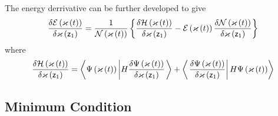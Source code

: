 The energy derrivative can be further developed to give 
\begin{equation}
\frac{\delta {\cal E}\left( {\cal \varkappa }\left( t\right) \right) }{%
\delta \varkappa \left( {\sf z}_{1}\right) }=\frac{1}{{\cal N}\left( {\cal %
\varkappa }\left( t\right) \right) }\left\{ \frac{\delta {\cal H}\left(
\varkappa \left( t\right) \right) }{\delta \varkappa \left( {\sf z}%
_{1}\right) }-{\cal E}\left( {\cal \varkappa }\left( t\right) \right) \frac{%
\delta {\cal N}\left( \varkappa \left( t\right) \right) }{\delta \varkappa
\left( {\sf z}_{1}\right) }\right\}
\end{equation}%
where 
\begin{equation}
\frac{\delta {\cal H}\left( \varkappa \left( t\right) \right) }{\delta
\varkappa \left( {\sf z}_{1}\right) }=\left\langle \Psi \left( {\cal %
\varkappa }\left( t\right) \right) \left| H\frac{\delta \Psi \left( {\cal %
\varkappa }\left( t\right) \right) }{\delta \varkappa \left( {\sf z}%
_{1}\right) }\right. \right\rangle +\left\langle \left. \frac{\delta \Psi
\left( {\cal \varkappa }\left( t\right) \right) }{\delta \varkappa \left( 
{\sf z}_{1}\right) }\right| H\Psi \left( {\cal \varkappa }\left( t\right)
\right) \right\rangle
\end{equation}

\subsection{Minimum Condition}

